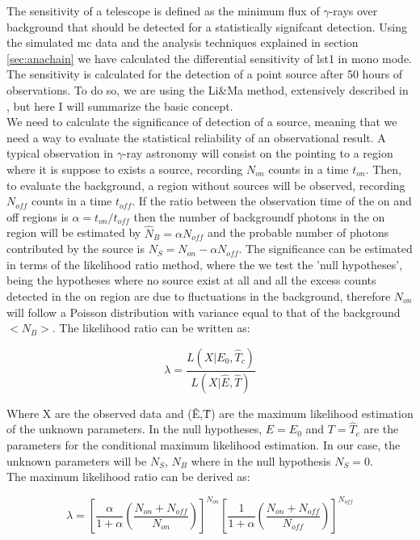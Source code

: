 \documentclass[main.tex]{subfiles}
\begin{document}
The sensitivity of a telescope is defined as the minimum flux of $\gamma$-rays over background that should be detected for a statistically signifcant detection. Using the simulated \gls{mc} data and the analysis techniques explained in section \ref{sec:anachain} we have calculated the differential sensitivity of \gls{lst}1 in mono mode.\\
The sensitivity is calculated for the detection of a point source after 50 hours of observations. To do so, we are using the Li\&Ma method, extensively described in \cite{1983LiMa}, but here I will summarize the basic concept.\\
We need to calculate the significance of detection of a source, meaning that we need a way to evaluate the statistical reliability of an observational result. A typical observation in $\gamma$-ray astronomy will consist on the pointing to a region where it is suppose to exists a source, recording $N_{on}$ counts in a time $t_{on}$. Then, to evaluate the background, a region without sources will be observed, recording $N_{off}$ counts in a time $t_{off}$. If the ratio between the observation time of the on and off regions is $\alpha = t_{on}/t_{off}$ then the number of backgroundf photons in the on region will be estimated by $\hat{N}_{B} = \alpha N_{off}$  and the probable number of photons contributed by the source is $N_{S} = N_{on}-\alpha N_{off}$. The significance can be estimated in terms of the likelihood ratio method, where the we test the 'null hypotheses', being the hypotheses where no source exist at all and all the excess counts detected in the on region are due to fluctuations in the background, therefore $N_{on}$ will follow a Poisson distribution with variance equal to that of the background $<N_{B}>$. The likelihood ratio can be written as:

\begin{equation}
  \lambda = \frac{L(X | E_{0}, \hat{T}_{c})}{L(X|\hat{E},\hat{T})}
\end{equation}

Where X are the observed data and (\^{E},\^{T}) are the maximum likelihood estimation of the unknown parameters. In the null hypotheses, $E=E_{0}$ and $T=\hat{T}_{c}$ are the parameters for the conditional maximum likelihood estimation. In our case, the unknown parameters will be $N_{S}$, $N_{B}$ where in the null hypothesis $N_{S}=0$.\\
The maximum likelihood ratio can be derived as:

\begin{equation}
  \lambda = \left[ \frac{\alpha}{1+\alpha}\left( \frac{N_{on}+N_{off}}{N_{on}}\right) \right]^{N_{on}} \left[ \frac{1}{1+\alpha}\left( \frac{N_{on}+N_{off}}{N_{off}}\right)\right]^{N_{off}}
\end{equation}
\end{document}

